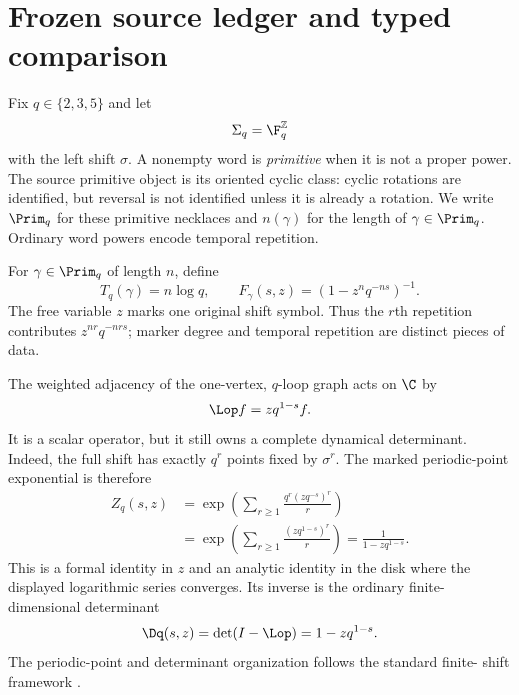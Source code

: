 \section{Frozen source ledger and typed comparison}
\label{sec:source-ledger}

Fix $q\in\{2,3,5\}$ and let
\[
  \Sigma_q=\F_q^{\mathbb Z}
\]
with the left shift $\sigma$. A nonempty word is \emph{primitive} when it is
not a proper power. The source primitive object is its oriented cyclic class:
cyclic rotations are identified, but reversal is not identified unless it is
already a rotation. We write $\Prim_q$ for these primitive necklaces and
$n(\gamma)$ for the length of $\gamma\in\Prim_q$. Ordinary word powers encode
temporal repetition.

\begin{definition}
For $\gamma\in\Prim_q$ of length $n$, define
\[
 T_q(\gamma)=n\log q,
 \qquad
 F_\gamma(s,z)=\left(1-z^nq^{-ns}\right)^{-1}.
\]
The free variable $z$ marks one original shift symbol. Thus the $r$th
repetition contributes $z^{nr}q^{-nrs}$; marker degree and temporal
repetition are distinct pieces of data.
\end{definition}

The weighted adjacency of the one-vertex, $q$-loop graph acts on $\C$ by
\[
  \Lop f=zq^{1-s}f.
\]
It is a scalar operator, but it still owns a complete dynamical determinant.
Indeed, the full shift has exactly $q^r$ points fixed by $\sigma^r$. The
marked periodic-point exponential is therefore
\begin{align}
 Z_q(s,z)
 &=\exp\left(\sum_{r\ge1}\frac{q^r(zq^{-s})^r}{r}\right) \\
 &=\exp\left(\sum_{r\ge1}\frac{(zq^{1-s})^r}{r}\right)
 =\frac{1}{1-zq^{1-s}}.                                      \label{eq:source-zeta}
\end{align}
This is a formal identity in $z$ and an analytic identity in the disk where
the displayed logarithmic series converges. Its inverse is the ordinary
finite-dimensional determinant
\begin{equation}
  \Dq(s,z)=\det(I-\Lop)=1-zq^{1-s}.                           \label{eq:source-det}
\end{equation}
The periodic-point and determinant organization follows the standard finite-
shift framework \citep{artin1965periodic,bowen1970zeta}.

